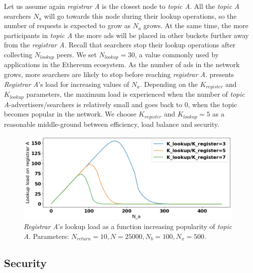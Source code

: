 Let us assume again \emph{registrar A} is the closest node to \emph{topic A}. All the \emph{topic A} searchers $N_a$ will go towards this node during their lookup operations, so the number of requests is expected to grow as $N_a$ grows. At the same time, the more participants in \emph{topic A} the more ads will be placed in other buckets further away from the \emph{registrar A}. Recall that searchers stop their lookup operations after collecting $N_{lookup}$ peers.  We set $N_{lookup} = 30$, a value commonly used by applications in the Ethereum ecosystem. As the number of ads in the network grows, more searchers are likely to stop before reaching \emph{registrar A}.  presents \emph{Registrar A}'s load for increasing values of $N_a$. Depending on the $K_{register}$ and $K_{lookup}$ parameters, the maximum load is experienced when the number of \emph{topic A}-advertisers/searchers is relatively small and goes back to $0$, when the topic becomes popular in the network. We choose $K_{register}$ and $K_{lookup} =5$ as a reasonable middle-ground between efficiency, load balance and security.

\begin{figure}[t]
    \includegraphics[width=1\linewidth]{img/fairness_lookup}
    \vspace{-0.05in}
    \caption{\emph{Registrar A}'s lookup load as a function increasing popularity of \emph{topic A}.
		Parameters: $N_{return}=10, N=25000, N_b=100, N_x=500$.}
    \label{fig:fairness_lookup}
    \vspace{-0.15in}
\end{figure}

\subsection{Security}

